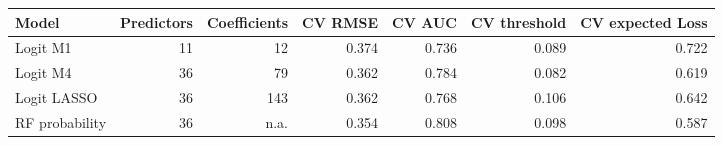 
\begin{tabular}{lrrrrrr}
\toprule
  Model & Predictors & Coefficients & CV RMSE & CV AUC & CV threshold & CV expected Loss\\
\midrule
Logit M1 & 11 & 12 & 0.374 & 0.736 & 0.089 & 0.722 \\
Logit M4 & 36 & 79 & 0.362  & 0.784 & 0.082 & 0.619 \\
Logit LASSO & 36 & 143 & 0.362 & 0.768 & 0.106 & 0.642 \\
RF probability & 36 & n.a. & 0.354 & 0.808 & 0.098 & 0.587 \\
\bottomrule
\end{tabular}
